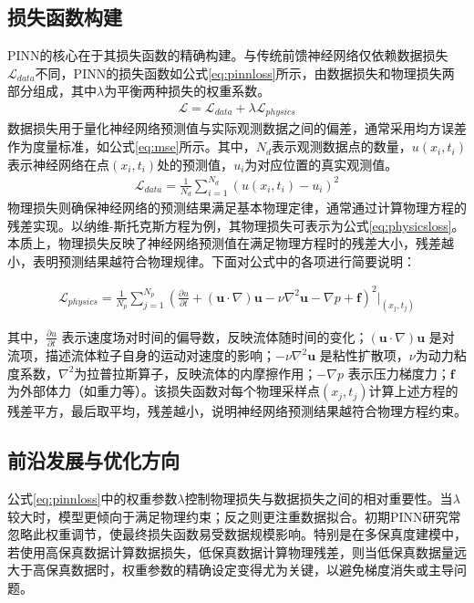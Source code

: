 \subsection{损失函数构建}
PINN的核心在于其损失函数的精确构建。与传统前馈神经网络仅依赖数据损失$\mathcal{L}_{data}$不同，PINN的损失函数如公式\eqref{eq:pinnloss}所示，由数据损失和物理损失两部分组成，其中$\lambda$为平衡两种损失的权重系数。
\begin{align}
  \mathcal{L} = \mathcal{L}_{data} + \lambda\mathcal{L}_{physics} \label{eq:pinnloss}
\end{align}
数据损失用于量化神经网络预测值与实际观测数据之间的偏差，通常采用均方误差作为度量标准，如公式\eqref{eq:mse}所示。其中，$N_d$表示观测数据点的数量，$u(x_i, t_i)$表示神经网络在点$(x_i, t_i)$处的预测值，$u_i$为对应位置的真实观测值。
\begin{align}
  \mathcal{L}_{data} = \frac{1}{N_d} \sum_{i=1}^{N_d} \left( u(x_i, t_i) - u_i \right)^2 \label{eq:mse}
\end{align}
物理损失则确保神经网络的预测结果满足基本物理定律，通常通过计算物理方程的残差实现。以纳维-斯托克斯方程为例，其物理损失可表示为公式\eqref{eq:physicsloss}。本质上，物理损失反映了神经网络预测值在满足物理方程时的残差大小，残差越小，表明预测结果越符合物理规律。下面对公式中的各项进行简要说明：

\begin{align}
  \mathcal{L}_{physics} = \frac{1}{N_p} \sum_{j=1}^{N_p} \left( \frac{\partial u}{\partial t} + (\mathbf{u} \cdot \nabla) \mathbf{u} - \nu \nabla^2 \mathbf{u} - \nabla p + \mathbf{f} \right)^2 \bigg|_{(x_j, t_j)} \label{eq:physicsloss}
\end{align}

其中，$\frac{\partial u}{\partial t}$ 表示速度场对时间的偏导数，反映流体随时间的变化；$(\mathbf{u} \cdot \nabla) \mathbf{u}$ 是对流项，描述流体粒子自身的运动对速度的影响；$-\nu \nabla^2 \mathbf{u}$ 是粘性扩散项，$\nu$为动力粘度系数，$\nabla^2$为拉普拉斯算子，反映流体的内摩擦作用；$-\nabla p$ 表示压力梯度力；$\mathbf{f}$ 为外部体力（如重力等）。该损失函数对每个物理采样点$(x_j, t_j)$计算上述方程的残差平方，最后取平均，残差越小，说明神经网络预测结果越符合物理方程约束。
\subsection{前沿发展与优化方向}
公式\eqref{eq:pinnloss}中的权重参数$\lambda$控制物理损失与数据损失之间的相对重要性。当$\lambda$较大时，模型更倾向于满足物理约束；反之则更注重数据拟合。初期PINN研究常忽略此权重调节，使最终损失函数易受数据规模影响。特别是在多保真度建模中，若使用高保真数据计算数据损失，低保真数据计算物理残差，则当低保真数据量远大于高保真数据时，权重参数的精确设定变得尤为关键，以避免梯度消失或主导问题\cite{luDeepXDEDeepLearning2021}。

